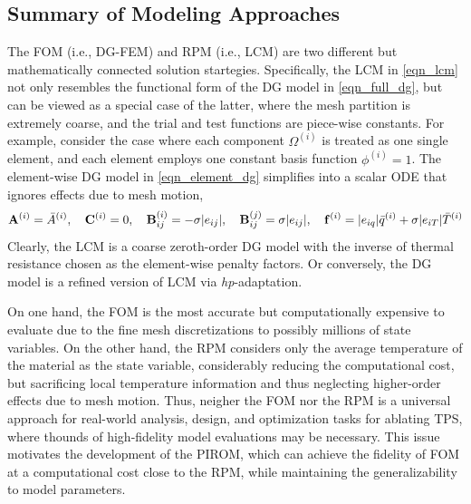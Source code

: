 \subsection{Summary of Modeling Approaches}

The FOM (i.e., DG-FEM) and RPM (i.e., LCM) are two different but mathematically connected solution startegies. Specifically, the LCM in \cref{eqn_lcm} not only resembles the functional form of the DG model in \cref{eqn_full_dg}, but can be viewed as a special case of the latter, where the mesh partition is extremely coarse, and the trial and test functions are piece-wise constants. For example, consider the case where each component $\Omega^{(i)}$ is treated as one single element, and each element employs one constant basis function $\phi^{(i)}=1$. The element-wise DG model in \cref{eqn_element_dg} simplifies into a scalar ODE that ignores effects due to mesh motion,
\begin{equation}
    \mathbf{A}^{(i)} = \bar{A}^{(i)},\quad \mathbf{C}^{(i)} = 0, \quad\mathbf{B}^{(i)}_{ij} = -\sigma|e_{ij}|,\quad \mathbf{B}^{(j)}_{ij}=\sigma|e_{ij}|,\quad \mathbf{f}^{(i)} = |e_{iq}|\bar{q}^{(i)} + \sigma|e_{iT}|\bar{T}^{(i)}
\end{equation}
Clearly, the LCM is a coarse zeroth-order DG model with the inverse of thermal resistance chosen as the element-wise penalty factors. Or conversely, the DG model is a refined version of LCM via \textit{hp}-adaptation.

On one hand, the FOM is the most accurate but computationally expensive to evaluate due to the fine mesh discretizations to possibly millions of state variables. On the other hand, the RPM considers only the average temperature of the material as the state variable, considerably reducing the computational cost, but sacrificing local temperature information and thus neglecting higher-order effects due to mesh motion. Thus, neigher the FOM nor the RPM is a universal approach for real-world analysis, design, and optimization tasks for ablating TPS, where thounds of high-fidelity model evaluations may be necessary. This issue motivates the development of the PIROM, which can achieve the fidelity of FOM at a computational cost close to the RPM, while maintaining the generalizability to model parameters.
